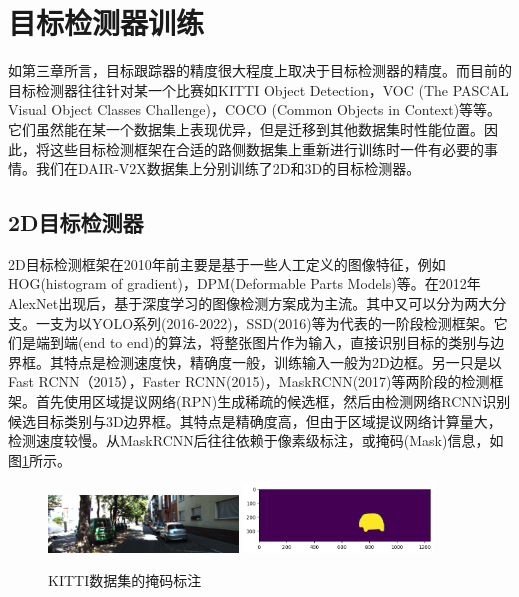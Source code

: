 \newpage
{}
\section{目标检测器训练}

如第三章所言，目标跟踪器的精度很大程度上取决于目标检测器的精度。而目前的目标检测器往往针对某一个比赛如KITTI Object Detection，VOC (The PASCAL Visual Object Classes Challenge)，COCO (Common Objects in Context)等等。它们虽然能在某一个数据集上表现优异，但是迁移到其他数据集时性能位置。因此，将这些目标检测框架在合适的路侧数据集上重新进行训练时一件有必要的事情。我们在DAIR-V2X数据集上分别训练了2D和3D的目标检测器。

\subsection{2D目标检测器}
2D目标检测框架在2010年前主要是基于一些人工定义的图像特征，例如HOG(histogram of gradient)，DPM(Deformable Parts Models)\cite{felzenszwalb2008discriminatively}等。在2012年AlexNet\cite{krizhevsky2017imagenet}出现后，基于深度学习的图像检测方案成为主流。其中又可以分为两大分支。一支为以YOLO系列(2016-2022)\cite{redmon2018yolov3}\cite{bochkovskiy2020yolov4}，SSD(2016)\cite{liu2016ssd}等为代表的一阶段检测框架。它们是端到端(end to end)的算法，将整张图片作为输入，直接识别目标的类别与边界框。其特点是检测速度快，精确度一般，训练输入一般为2D边框。另一只是以Fast RCNN（2015）\cite{girshick2015fast}，Faster RCNN(2015)\cite{ren2015faster}，MaskRCNN(2017)\cite{he2017mask}等两阶段的检测框架。首先使用区域提议网络(RPN)生成稀疏的候选框，然后由检测网络RCNN识别候选目标类别与3D边界框。其特点是精确度高，但由于区域提议网络计算量大，检测速度较慢。从MaskRCNN后往往依赖于像素级标注，或掩码(Mask)信息，如图\ref{fig19}所示。

\begin{figure}[htb] 
    \center
    \includegraphics[width=0.45\textwidth]{figure/fig20.png}
    \includegraphics[width=0.45\textwidth]{figure/fig19.png}
    \caption{KITTI数据集的掩码标注}
    \label{fig19}
\end{figure}

